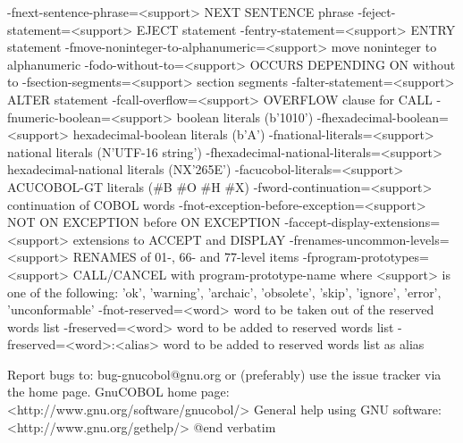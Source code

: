  -fnext-sentence-phrase=<support> NEXT SENTENCE phrase
  -feject-statement=<support> EJECT statement
  -fentry-statement=<support> ENTRY statement
  -fmove-noninteger-to-alphanumeric=<support> move noninteger to alphanumeric
  -fodo-without-to=<support> OCCURS DEPENDING ON without to
  -fsection-segments=<support> section segments
  -falter-statement=<support> ALTER statement
  -fcall-overflow=<support> OVERFLOW clause for CALL
  -fnumeric-boolean=<support> boolean literals (b'1010')
  -fhexadecimal-boolean=<support> hexadecimal-boolean literals (b'A')
  -fnational-literals=<support> national literals (N'UTF-16 string')
  -fhexadecimal-national-literals=<support> hexadecimal-national literals (NX'265E')
  -facucobol-literals=<support> ACUCOBOL-GT literals (#B #O #H #X)
  -fword-continuation=<support> continuation of COBOL words
  -fnot-exception-before-exception=<support> NOT ON EXCEPTION before ON EXCEPTION
  -faccept-display-extensions=<support> extensions to ACCEPT and DISPLAY
  -frenames-uncommon-levels=<support> RENAMES of 01-, 66- and 77-level items
  -fprogram-prototypes=<support> CALL/CANCEL with program-prototype-name
	where <support> is one of the following:
	'ok', 'warning', 'archaic', 'obsolete', 'skip', 'ignore', 'error', 'unconformable'
  -fnot-reserved=<word> word to be taken out of the reserved words list
  -freserved=<word>     word to be added to reserved words list
  -freserved=<word>:<alias> word to be added to reserved words list as alias


Report bugs to: bug-gnucobol@gnu.org
or (preferably) use the issue tracker via the home page.
GnuCOBOL home page: <http://www.gnu.org/software/gnucobol/>
General help using GNU software: <http://www.gnu.org/gethelp/>
@end verbatim

